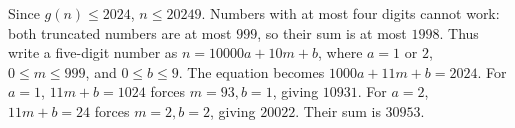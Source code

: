 Since $g(n)\le2024$, $n\le20249$. Numbers with at most four digits cannot work: both truncated numbers are at most $999$, so their sum is at most $1998$. Thus write a five-digit number as $n=10000a+10m+b$, where $a=1$ or $2$, $0\le m\le999$, and $0\le b\le9$. The equation becomes $1000a+11m+b=2024$.
For $a=1$, $11m+b=1024$ forces $m=93,b=1$, giving $10931$. For $a=2$, $11m+b=24$ forces $m=2,b=2$, giving $20022$. Their sum is $\boxed{30953}$.
